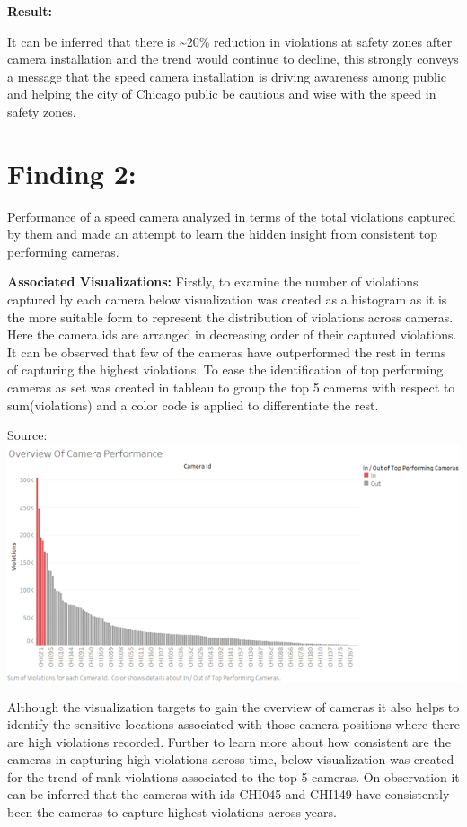 \documentclass[]{book}
\begin{document}
\textbf{Result:}

It can be inferred that there is \textasciitilde{}20\% reduction in violations at safety zones after camera installation and the trend would continue to decline, this strongly conveys a message that the speed camera installation is driving awareness among public and helping the city of Chicago public be cautious and wise with the speed in safety zones.

\hypertarget{finding-2}{%
\section{Finding 2:}\label{finding-2}}

Performance of a speed camera analyzed in terms of the total violations captured by them and made an attempt to learn the hidden insight from consistent top performing cameras.

\textbf{Associated Visualizations:}
Firstly, to examine the number of violations captured by each camera below visualization was created as a histogram as it is the more suitable form to represent the distribution of violations across cameras. Here the camera ids are arranged in decreasing order of their captured violations. It can be observed that few of the cameras have outperformed the rest in terms of capturing the highest violations. To ease the identification of top performing cameras as set was created in tableau to group the top 5 cameras with respect to sum(violations) and a color code is applied to differentiate the rest.

Source:\citep{tableau}
\includegraphics{images/Image5.png}

Although the visualization targets to gain the overview of cameras it also helps to identify the sensitive locations associated with those camera positions where there are high violations recorded. Further to learn more about how consistent are the cameras in capturing high violations across time, below visualization was created for the trend of rank violations associated to the top 5 cameras. On observation it can be inferred that the cameras with ids CHI045 and CHI149 have consistently been the cameras to capture highest violations across years.
\end{document}

